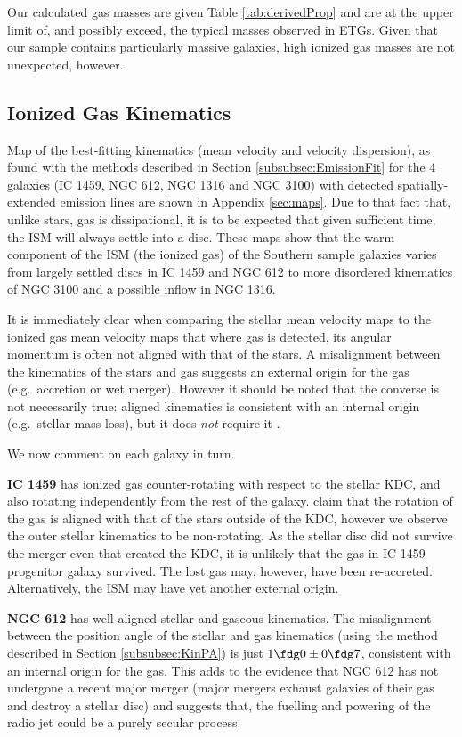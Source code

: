 \documentclass[a4paper,fleqn,usenatbib]{mnras}
\begin{document}
	Our calculated gas masses are given Table \ref{tab:derivedProp} and are at the upper limit of, and possibly exceed, the typical masses observed in ETGs. Given that our sample contains particularly massive galaxies, high ionized gas masses are not unexpected, however.

	\subsection{Ionized Gas Kinematics}
		\label{subsec:GasKin}
		Map of the best-fitting kinematics (mean velocity and velocity dispersion), as found with the methods described in Section \ref{subsubsec:EmissionFit} for the 4 galaxies (IC 1459, NGC 612, NGC 1316 and NGC 3100) with detected spatially-extended emission lines are shown in Appendix \ref{sec:maps}. Due to that fact that, unlike stars, gas is dissipational, it is to be expected that given sufficient time, the ISM will always settle into a disc. These maps show that the warm component of the ISM (the ionized gas) of the Southern sample galaxies varies from largely settled discs in IC 1459 and NGC 612 to more disordered kinematics of NGC 3100 and a possible inflow in NGC 1316.

		It is immediately clear when comparing the stellar mean velocity maps to the ionized gas mean velocity maps that where gas is detected, its angular momentum is often not aligned with that of the stars. A misalignment between the kinematics of the stars and gas suggests an external origin for the gas (e.g.\ accretion or wet merger). However it should be noted that the converse is not necessarily true: aligned kinematics is consistent with an internal origin (e.g.\ stellar-mass loss), but it does \emph{not} require it \citep[e.g.][]{Davis2011a}. 

		We now comment on each galaxy in turn.

		\textbf{IC 1459} has ionized gas counter-rotating with respect to the stellar KDC, and also rotating independently from the rest of the galaxy. \citet{Franx1988} claim that the rotation of the gas is aligned with that of the stars outside of the KDC, however we observe the outer stellar kinematics to be non-rotating. As the stellar disc did not survive the merger even that created the KDC, it is unlikely that the gas in IC 1459 progenitor galaxy survived. The lost gas may, however, have been re-accreted. Alternatively, the ISM may have yet another external origin. 

		\textbf{NGC 612} has well aligned stellar and gaseous kinematics. The misalignment between the position angle of the stellar and gas kinematics (using the method described in Section \ref{subsubsec:KinPA}) is just $1\fdg0\pm0\fdg7$, consistent with an internal origin for the gas. This adds to the evidence that NGC 612 has not undergone a recent major merger (major mergers exhaust galaxies of their gas and destroy a stellar disc) and suggests that, the fuelling and powering of the radio jet could be a purely secular process. 
\end{document}
